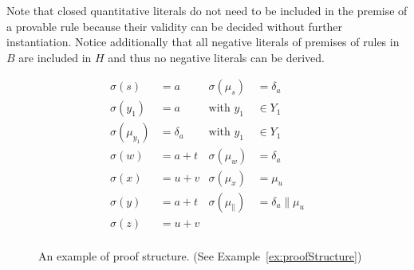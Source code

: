\documentclass[submission,copyright,creativecommons]{eptcs}
\newcommand{\ddedrule}[2]{\frac{\displaystyle #1}{\displaystyle #2}}
\newcommand{\trans}[1][]{\xrightarrow{\, {#1} \, }}
\begin{document}
 Note that closed quantitative literals do not need to be included in the premise of a provable rule because their validity can be decided without further instantiation. Notice additionally that all negative literals of premises of rules in $B$ are included in $H$ and thus no negative literals can be derived.


  \begin{figure}
\begin{minipage}{0.59 \linewidth}
 \centering\small
{}
\end{minipage}
\hfill \begin{minipage}{0.33\linewidth}
 \begin{align*}
  \sigma(s) & = a &  \sigma(\mu_s) & = \delta_a\\
  \sigma(y_1) & = a & \text{with } y_1 & \in Y_1 \\
  \sigma(\mu_{y_1}) & = \delta_a & \text{with } y_1 & \in Y_1 \\
  \sigma(w) & = a + t & \sigma(\mu_w) & = \delta_{a}\\
   \sigma(x) & = u + v & \sigma(\mu_x) & = \mu_u \\
   \sigma(y) & = a + t & \sigma(\mu_{\parallel}) & = \delta_a \parallel \mu_u\\
   \sigma(z) & = u + v & & \\\end{align*}
\end{minipage}
\caption{An example of proof structure. (See Example~\ref{ex:proofStructure})}
\label{fig:proofStructure}
\end{figure}
\end{document}

